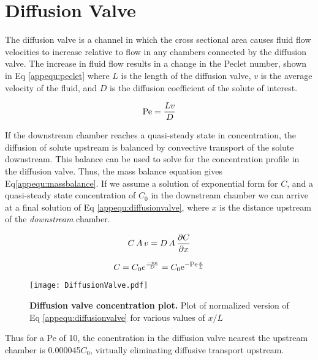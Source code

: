\chapter{Diffusion Valve}
\label{App:DiffusionValve}

The diffusion valve is a channel in which the cross sectional area causes fluid flow velocities to increase relative to flow in any chambers connected by the diffusion valve. The increase in fluid flow results in a change in the Peclet number, shown in Eq \ref{appequ:peclet} where $L$ is the length of the diffusion valve, $v$ is the average velocity of the fluid, and $D$ is the diffusion coefficient of the solute of interest. 

\begin{equation}
\centering
\textrm{Pe} = \frac{Lv}{D}
\label{appequ:peclet}
\end{equation}

If the downstream chamber reaches a quasi-steady state in concentration, the diffusion of solute upstream is balanced by convective transport of the solute downstream. This balance can be used to solve for the concentration profile in the diffusion valve. Thus, the mass balance equation gives Eq\ref{appequ:massbalance}. If we assume a solution of exponential form for $C$, and a quasi-steady state concentration of $C_{0}$ in the downstream chamber we can arrive at a final solution of Eq \ref{appequ:diffusionvalve}, where $x$ is the distance upstream of the \emph{downstream} chamber.

\begin{equation}
\centering
C\,A\,v = D\,A\,\frac{\partial C}{\partial x}
\label{appequ:massbalance}
\end{equation}


\begin{equation}
\centering
C = C_{0}e^{\frac{-vx}{D}} = C_{0}\textrm{e}^{-\textrm{\footnotesize Pe}\frac{x}{L}}
\label{appequ:diffusionvalve}
\end{equation}

\begin{figure}[!ht]
\centering
\texttt{[image: DiffusionValve.pdf]}
\caption{\textbf{Diffusion valve concentration plot.} Plot of normalized version of Eq \ref{appequ:diffusionvalve} for various values of $x/L$}
\label{fig:diffusionvalve}
\end{figure}

Thus for a Pe of 10, the conentration in the diffusion valve nearest the upstream chamber is 0.000045$C_{0}$, virtually eliminating diffusive transport upstream.



